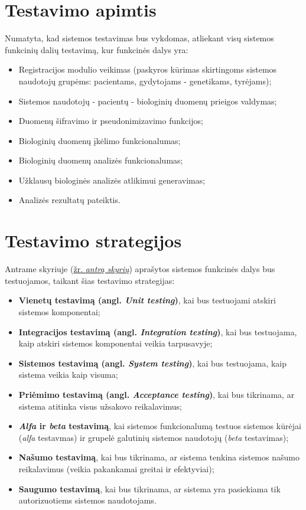 \documentclass[12pt]{article}
\begin{document}

\section{Testavimo apimtis}
\label{sec:scope}
Numatyta, kad sistemos testavimas bus vykdomas, atliekant visų sistemos
funkcinių dalių testavimą, kur funkcinės dalys yra:
\begin{itemize}
    \item Registracijos modulio veikimas (paskyros kūrimas skirtingoms sistemos
    naudotojų grupėms: pacientams, gydytojams - genetikams, tyrėjams);
    \item Sistemos naudotojų - pacientų - biologinių duomenų prieigos valdymas;
    \item Duomenų šifravimo ir pseudonimizavimo funkcijos;
    \item Biologinių duomenų įkėlimo funkcionalumas;
    \item Biologinių duomenų analizės funkcionalumas;
    \item Užklausų biologinės analizės atlikimui generavimas;
    \item Analizės rezultatų pateiktis.
\end{itemize}

\newpage


\section{Testavimo strategijos}
Antrame skyriuje (\hyperref[sec:scope]{žr. \emph{antrą skyrių}}) aprašytos
sistemos funkcinės dalys bus testuojamos, taikant šias testavimo strategijas:
\begin{itemize}
    \item \textbf{Vienetų testavimą (angl. \emph{Unit testing})}, kai bus
    testuojami atskiri sistemos komponentai;
    \item \textbf{Integracijos testavimą (angl. \emph{Integration testing})},
    kai bus testuojama, kaip atskiri sistemos komponentai veikia tarpusavyje;
    \item \textbf{Sistemos testavimą (angl. \emph{System testing})}, kai bus
    testuojama, kaip sistema veikia kaip visuma;
    \item \textbf{Priėmimo testavimą (angl. \emph{Acceptance testing})}, kai bus
    tikrinama, ar sistema atitinka visus užsakovo reikalavimus;
    \item \textbf{\emph{Alfa} ir \emph{beta} testavimą}, kai sistemos
    funkcionalumą testuos sistemos kūrėjai (\emph{alfa} testavmas) ir grupelė
    galutinių sistemos naudotojų (\emph{beta} testavimas);
    \item \textbf{Našumo testavimą}, kai bus tikrinama, ar sistema tenkina
    sistemos našumo reikalavimus (veikia pakankamai greitai ir efektyviai);
    \item \textbf{Saugumo testavimą}, kai bus tikrinama, ar sistema yra
    pasiekiama tik autorizuotiems sistemos naudotojams.
\end{itemize}
\end{document}
